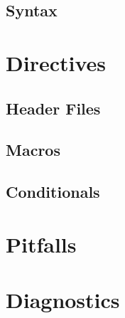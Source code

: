 \documentclass{beamer}
\begin{document}
\subsection{Syntax}

\section{Directives}

\subsection{Header Files}

\subsection{Macros}

\subsection{Conditionals}

\section{Pitfalls}

\section{Diagnostics}
\end{document}
